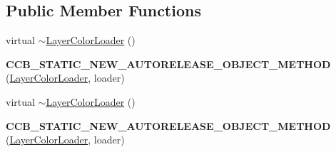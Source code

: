 \subsection*{Public Member Functions}
\begin{DoxyCompactItemize}
\item 
virtual \hyperlink{classcocosbuilder_1_1LayerColorLoader_aab0b9805055647ceb1d06c0821082a05}{$\sim$\+Layer\+Color\+Loader} ()
\item 
\mbox{\label{classcocosbuilder_1_1LayerColorLoader_aab80caec9ba89a359f90aace66f935ba}} 
{\bfseries C\+C\+B\+\_\+\+S\+T\+A\+T\+I\+C\+\_\+\+N\+E\+W\+\_\+\+A\+U\+T\+O\+R\+E\+L\+E\+A\+S\+E\+\_\+\+O\+B\+J\+E\+C\+T\+\_\+\+M\+E\+T\+H\+OD} (\hyperlink{classcocosbuilder_1_1LayerColorLoader}{Layer\+Color\+Loader}, loader)
\item 
virtual \hyperlink{classcocosbuilder_1_1LayerColorLoader_aab0b9805055647ceb1d06c0821082a05}{$\sim$\+Layer\+Color\+Loader} ()
\item 
\mbox{\label{classcocosbuilder_1_1LayerColorLoader_aab80caec9ba89a359f90aace66f935ba}} 
{\bfseries C\+C\+B\+\_\+\+S\+T\+A\+T\+I\+C\+\_\+\+N\+E\+W\+\_\+\+A\+U\+T\+O\+R\+E\+L\+E\+A\+S\+E\+\_\+\+O\+B\+J\+E\+C\+T\+\_\+\+M\+E\+T\+H\+OD} (\hyperlink{classcocosbuilder_1_1LayerColorLoader}{Layer\+Color\+Loader}, loader)
\end{DoxyCompactItemize}
